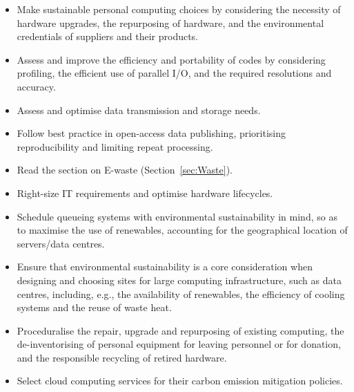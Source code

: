 \documentclass[../SustainableHEP.tex]{subfiles}
\begin{document}

\newpage
\begin{reco2}{\currentname}
{
\begin{itemize}[leftmargin=6 mm]
\item Make sustainable personal computing choices by considering the necessity of hardware upgrades, the repurposing of hardware, and the environmental credentials of suppliers and their products.

\item Assess and improve the efficiency and portability of codes by considering \eg profiling, the efficient use of parallel I/O, and the required resolutions and accuracy.

\item Assess and optimise data transmission and storage needs.

\item Follow best practice in open-access data publishing, prioritising reproducibility and limiting repeat processing.

\item Read the section on E-waste (Section~\ref{sec:Waste}).

\end{itemize}
}
{
\begin{itemize}[leftmargin=6 mm]
\item Right-size IT requirements and optimise hardware lifecycles.
\item Schedule queueing systems with environmental sustainability in mind, so as to maximise the use of renewables, accounting for the geographical location of servers/data centres.
\end{itemize}
}
{
\begin{itemize}[leftmargin=6 mm]
\item Ensure that environmental sustainability is a core consideration when designing and choosing sites for large computing infrastructure, such as data centres, including, e.g., the availability of renewables, the efficiency of cooling systems and the reuse of waste heat.

\item Proceduralise the repair, upgrade and repurposing of existing computing, the de-inventorising of personal equipment for leaving personnel or for donation, and the responsible recycling of retired hardware.

\item Select cloud computing services for their carbon emission mitigation policies.

\end{itemize}
}
\end{reco2}
\end{document}
